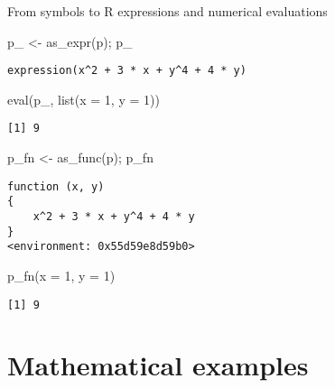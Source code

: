\documentclass[
  ignorenonframetext,
]{beamer}
\newenvironment{Shaded}{\begin{snugshade}}{\end{snugshade}}
\newcommand{\AttributeTok}[1]{\textcolor[rgb]{0.40,0.45,0.13}{#1}}
\newcommand{\DecValTok}[1]{\textcolor[rgb]{0.68,0.00,0.00}{#1}}
\newcommand{\FunctionTok}[1]{\textcolor[rgb]{0.28,0.35,0.67}{#1}}
\newcommand{\NormalTok}[1]{\textcolor[rgb]{0.00,0.23,0.31}{#1}}
\newcommand{\OtherTok}[1]{\textcolor[rgb]{0.00,0.23,0.31}{#1}}
\begin{document}
\begin{frame}[fragile]{From symbols to R expressions and numerical
evaluations}
\protect\hypertarget{from-symbols-to-r-expressions-and-numerical-evaluations}{}
\begin{Shaded}
\begin{Highlighting}[]
\NormalTok{p\_ }\OtherTok{\textless{}{-}} \FunctionTok{as\_expr}\NormalTok{(p); p\_}
\end{Highlighting}
\end{Shaded}

\begin{verbatim}
expression(x^2 + 3 * x + y^4 + 4 * y)
\end{verbatim}

\begin{Shaded}
\begin{Highlighting}[]
\FunctionTok{eval}\NormalTok{(p\_, }\FunctionTok{list}\NormalTok{(}\AttributeTok{x =} \DecValTok{1}\NormalTok{, }\AttributeTok{y =} \DecValTok{1}\NormalTok{))}
\end{Highlighting}
\end{Shaded}

\begin{verbatim}
[1] 9
\end{verbatim}

\begin{Shaded}
\begin{Highlighting}[]
\NormalTok{p\_fn }\OtherTok{\textless{}{-}} \FunctionTok{as\_func}\NormalTok{(p); p\_fn}
\end{Highlighting}
\end{Shaded}

\begin{verbatim}
function (x, y) 
{
    x^2 + 3 * x + y^4 + 4 * y
}
<environment: 0x55d59e8d59b0>
\end{verbatim}

\begin{Shaded}
\begin{Highlighting}[]
\FunctionTok{p\_fn}\NormalTok{(}\AttributeTok{x =} \DecValTok{1}\NormalTok{, }\AttributeTok{y =} \DecValTok{1}\NormalTok{)}
\end{Highlighting}
\end{Shaded}

\begin{verbatim}
[1] 9
\end{verbatim}
\end{frame}

\hypertarget{mathematical-examples}{%
\section{Mathematical examples}\label{mathematical-examples}}
\end{document}
